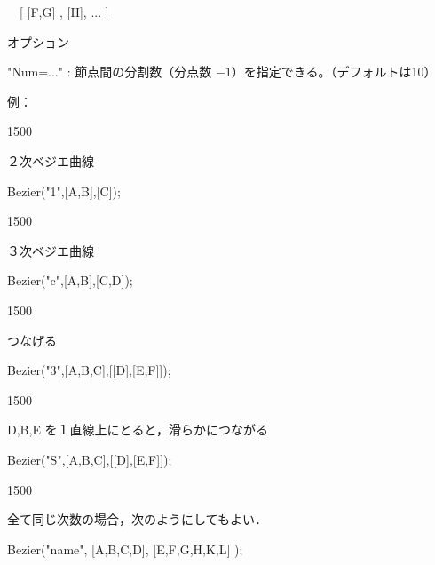 \documentclass[papersize,a4paper,12pt,uplatex]{jsarticle}
\begin{document}
\begin{description}
　[ [F,G] , [H], ... ]

オプション

"Num=..."  : 節点間の分割数（分点数 $-1$）を指定できる。（デフォルトは10）

\vspace{5mm}

例：

\begin{layer}{150}{0}
\end{layer}

２次ベジエ曲線

Bezier("1",[A,B],[C]);

\vspace{20mm}

\begin{layer}{150}{0}
\end{layer}

３次ベジエ曲線

Bezier("c",[A,B],[C,D]);

\vspace{20mm}

\begin{layer}{150}{0}
\end{layer}

つなげる

Bezier("3",[A,B,C],[[D],[E,F]]);

\vspace{20mm}

\begin{layer}{150}{0}
\end{layer}

D,B,E を１直線上にとると，滑らかにつながる

Bezier("S",[A,B,C],[[D],[E,F]]);

\vspace{25mm}


\begin{layer}{150}{0}
\end{layer}

全て同じ次数の場合，次のようにしてもよい．

Bezier("name", [A,B,C,D], [E,F,G,H,K,L] );   

\vspace{30mm}


\end{description}
\end{document}

